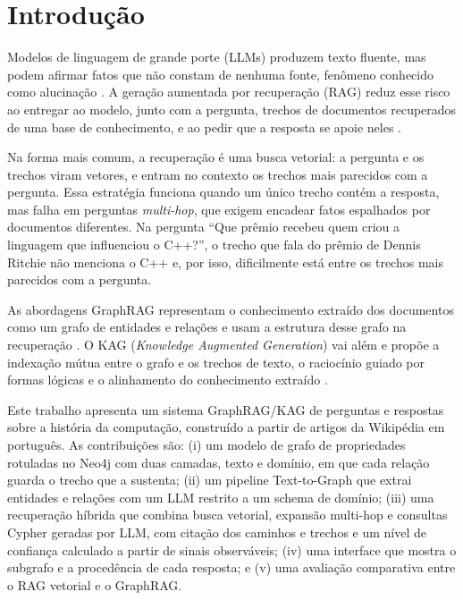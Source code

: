 \documentclass[12pt]{article}
\begin{document}
\section{Introdução}

Modelos de linguagem de grande porte (LLMs) produzem texto fluente, mas podem afirmar
fatos que não constam de nenhuma fonte, fenômeno conhecido como alucinação
\cite{ji2023survey}. A geração aumentada por recuperação (RAG) reduz esse risco ao
entregar ao modelo, junto com a pergunta, trechos de documentos recuperados de uma base
de conhecimento, e ao pedir que a resposta se apoie neles \cite{lewis2020rag}.

Na forma mais comum, a recuperação é uma busca vetorial: a pergunta e os trechos viram
vetores, e entram no contexto os trechos mais parecidos com a pergunta. Essa estratégia
funciona quando um único trecho contém a resposta, mas falha em perguntas
\textit{multi-hop}, que exigem encadear fatos espalhados por documentos diferentes. Na
pergunta ``Que prêmio recebeu quem criou a linguagem que influenciou o C++?'', o trecho
que fala do prêmio de Dennis Ritchie não menciona o C++ e, por isso, dificilmente está
entre os trechos mais parecidos com a pergunta.

As abordagens GraphRAG representam o conhecimento extraído dos documentos como um grafo
de entidades e relações e usam a estrutura desse grafo na recuperação
\cite{edge2024graphrag,peng2024graphragsurvey}. O KAG (\textit{Knowledge Augmented
Generation}) vai além e propõe a indexação mútua entre o grafo e os trechos de texto, o
raciocínio guiado por formas lógicas e o alinhamento do conhecimento extraído
\cite{liang2024kag}.

Este trabalho apresenta um sistema GraphRAG/KAG de perguntas e respostas sobre a
história da computação, construído a partir de artigos da Wikipédia em português. As
contribuições são: (i) um modelo de grafo de propriedades rotuladas no Neo4j com duas
camadas, texto e domínio, em que cada relação guarda o trecho que a sustenta; (ii) um
pipeline Text-to-Graph que extrai entidades e relações com um LLM restrito a um schema
de domínio; (iii) uma recuperação híbrida que combina busca vetorial, expansão
multi-hop e consultas Cypher geradas por LLM, com citação dos caminhos e trechos e um
nível de confiança calculado a partir de sinais observáveis; (iv) uma interface que
mostra o subgrafo e a procedência de cada resposta; e (v) uma avaliação comparativa entre
o RAG vetorial e o GraphRAG.
\end{document}
